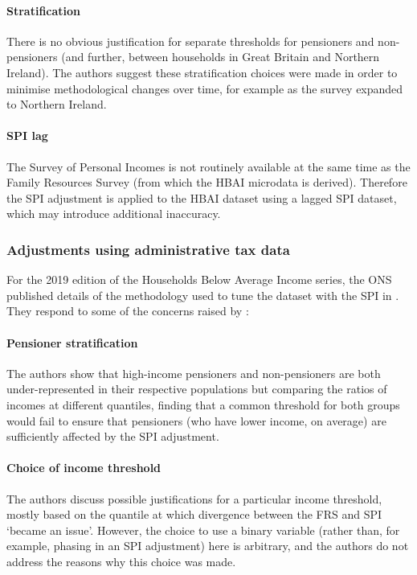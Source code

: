 \documentclass[10pt,journal,compsoc]{IEEEtran}
\begin{document}
\paragraph{Stratification} There is no obvious justification for separate thresholds for pensioners and non-pensioners (and further, between households in Great Britain and Northern Ireland). The authors suggest these stratification choices were made in order to minimise methodological changes over time, for example as the survey expanded to Northern Ireland.
\paragraph{SPI lag} The Survey of Personal Incomes is not routinely available at the same time as the Family Resources Survey (from which the HBAI microdata is derived). Therefore the SPI adjustment is applied to the HBAI dataset using a lagged SPI dataset, which may introduce additional inaccuracy.

\subsubsection{Adjustments using administrative tax data}

For the 2019 edition of the Households Below Average Income series, the ONS published details of the methodology used to tune the dataset with the SPI in \cite{ons_spi_version_2}. They respond to some of the concerns raised by \cite{ifs_survey_under_coverage}:

\paragraph{Pensioner stratification} The authors show that high-income pensioners and non-pensioners are both under-represented in their respective populations but comparing the ratios of incomes at different quantiles, finding that a common threshold for both groups would fail to ensure that pensioners (who have lower income, on average) are sufficiently affected by the SPI adjustment.

\paragraph{Choice of income threshold} The authors discuss possible justifications for a particular income threshold, mostly based on the quantile at which divergence between the FRS and SPI `became an issue'. However, the choice to use a binary variable (rather than, for example, phasing in an SPI adjustment) here is arbitrary, and the authors do not address the reasons why this choice was made.
\end{document}
